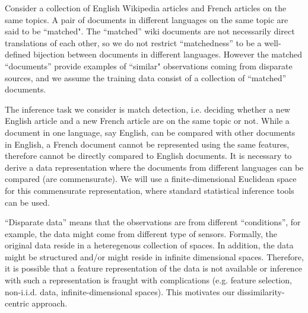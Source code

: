 \documentclass[12pt,oneside,final]{thesis}\usepackage[]{graphicx}\usepackage[]{color}
\begin{document}
	Consider a collection of  English Wikipedia articles  and   French articles on the same topics. A pair of documents in different languages on the same topic are said to be ``matched". The ``matched'' wiki documents are  not necessarily direct translations of each other, so  we do not restrict ``matchedness'' to be a well-defined bijection between documents in different languages.
	However the matched ``documents''  provide examples of  ``similar"  observations coming from disparate sources, and we assume the training data consist of  a collection of ``matched'' documents.
	
  The inference task we consider is match detection, i.e. deciding whether a new English article and a new French article are on the same topic or not. While  a document in one language, say English, can be compared with other documents in English, a  French document  cannot be represented using the same features, therefore cannot be directly compared to English documents.  It is necessary   to derive a data representation  where the  documents from different languages can be compared (are commensurate).  %
	We will use a finite-dimensional Euclidean space for  this commensurate representation, where standard  statistical inference tools can be used.
	
     ``Disparate data''  means that  the observations are from  different ``conditions'', for example, the data might come from different type of sensors. Formally, the original data  reside in a heteregenous collection of  spaces.  In addition, the data might be structured and/or might reside in  infinite dimensional spaces. Therefore, it is possible that a feature representation of the data is not available or inference with such a representation is fraught with complications (e.g. feature selection, non-i.i.d. data, infinite-dimensional spaces). This motivates our  dissimilarity-centric approach.
		
\end{document}
